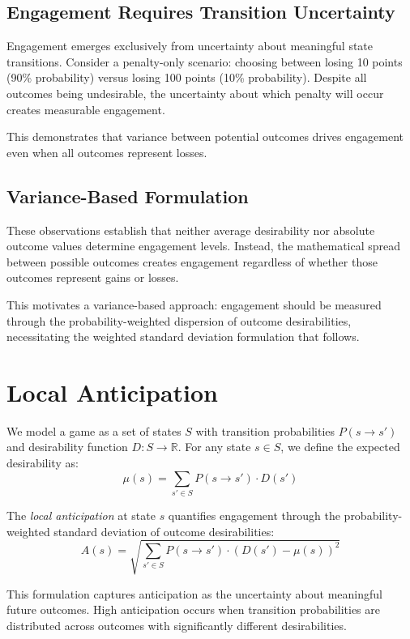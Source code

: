 \documentclass[manuscript,review,anonymous]{acmart}
\theoremstyle{definition}
\theoremstyle{plain}
\begin{document}
\subsection{Engagement Requires Transition Uncertainty}
Engagement emerges exclusively from uncertainty about meaningful state transitions.
Consider a penalty-only scenario: choosing between losing 10 points (90\% probability) versus losing 100 points (10\% probability).
Despite all outcomes being undesirable, the uncertainty about which penalty will occur creates measurable engagement.

This demonstrates that variance between potential outcomes drives engagement even when all outcomes represent losses.

\subsection{Variance-Based Formulation}
These observations establish that neither average desirability nor absolute outcome values determine engagement levels.
Instead, the mathematical spread between possible outcomes creates engagement regardless of whether those outcomes represent gains or losses.

This motivates a variance-based approach: engagement should be measured through the probability-weighted dispersion of outcome desirabilities, necessitating the weighted standard deviation formulation that follows.

\section{Local Anticipation}
We model a game as a set of states $S$ with transition probabilities $P(s \to s')$ and desirability function $D: S \to \mathbb{R}$.
For any state $s \in S$, we define the expected desirability as:
\begin{equation}
  \mu(s) = \sum_{s' \in S} P(s \to s') \cdot D(s')
\end{equation}

The \emph{local anticipation} at state $s$ quantifies engagement through the probability-weighted standard deviation of outcome desirabilities:
\begin{equation}
  A(s) = \sqrt{\sum_{s' \in S} P(s \to s') \cdot (D(s') - \mu(s))^2}
\end{equation}

This formulation captures anticipation as the uncertainty about meaningful future outcomes.
High anticipation occurs when transition probabilities are distributed across outcomes with significantly different desirabilities.
\end{document}
